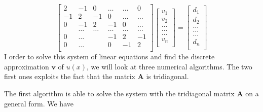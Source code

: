 \documentclass[11pt]{article}
\begin{document}
\[
\begin{bmatrix}
    2& -1& 0 &\dots   & \dots &0 \\
    -1 & 2 & -1 &0 &\dots &\dots \\
     0&-1 &2 & -1 & 0 & \dots \\
     & \dots   & \dots &\dots   &\dots & \dots \\
     0&\dots   &  &-1 &2& -1 \\
     0&\dots    &  & 0  &-1 & 2 \\
\end{bmatrix}
\begin{bmatrix}
      v_1\\
      v_2\\
      \dots \\
      \dots  \\
      \dots \\
      v_n\\
\end{bmatrix}
=\begin{bmatrix}
      d_1\\
      d_2\\
      \dots \\
      \dots \\
      \dots \\
      d_n\\
\end{bmatrix}
\]
I order to solve this system of linear equations and find the discrete approximation $\mathbf{v}$ of
$u(x)$, we will look at three numerical algorithms. The two first ones exploits the fact that
the matrix $\mathbf{A}$ is tridiagonal.

\vspace{4mm}
\noindent
The first algorithm is able to solve the system with the tridiagonal matrix $\mathbf{A}$ on a general
form. We have 
\end{document}

